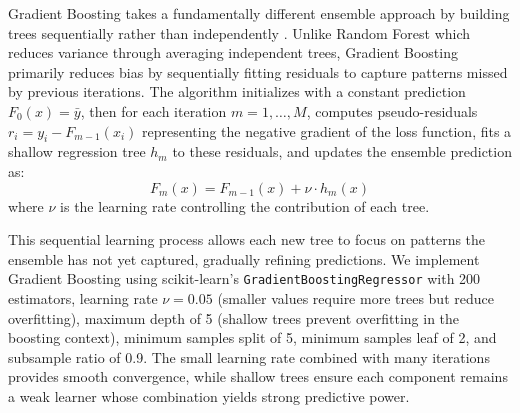 \documentclass[10pt,twocolumn]{article}
\begin{document}
\par Gradient Boosting takes a fundamentally different ensemble approach by building trees sequentially rather than independently \cite{friedman2001greedy}. Unlike Random Forest which reduces variance through averaging independent trees, Gradient Boosting primarily reduces bias by sequentially fitting residuals to capture patterns missed by previous iterations. The algorithm initializes with a constant prediction $F_0(x) = \bar{y}$, then for each iteration $m = 1, \ldots, M$, computes pseudo-residuals $r_i = y_i - F_{m-1}(x_i)$ representing the negative gradient of the loss function, fits a shallow regression tree $h_m$ to these residuals, and updates the ensemble prediction as:
\begin{equation}
F_m(x) = F_{m-1}(x) + \nu \cdot h_m(x)
\end{equation}
where $\nu$ is the learning rate controlling the contribution of each tree.
\par This sequential learning process allows each new tree to focus on patterns the ensemble has not yet captured, gradually refining predictions. We implement Gradient Boosting using scikit-learn's \texttt{GradientBoostingRegressor} with 200 estimators, learning rate $\nu = 0.05$ (smaller values require more trees but reduce overfitting), maximum depth of 5 (shallow trees prevent overfitting in the boosting context), minimum samples split of 5, minimum samples leaf of 2, and subsample ratio of 0.9. The small learning rate combined with many iterations provides smooth convergence, while shallow trees ensure each component remains a weak learner whose combination yields strong predictive power.
\end{document}
